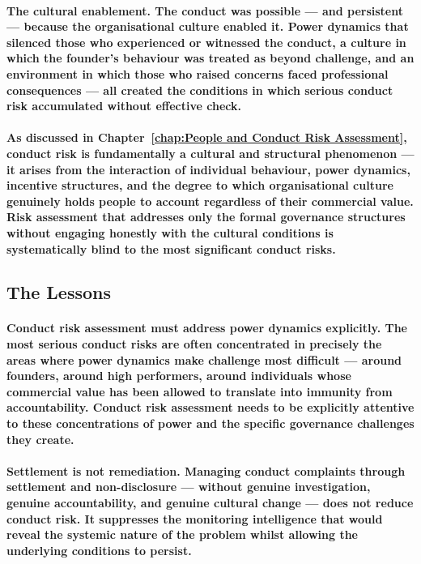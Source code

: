 \paragraph{\textbf{The cultural enablement}. The conduct was possible — and persistent — because the organisational culture enabled it. Power dynamics that silenced those who experienced or witnessed the conduct, a culture in which the founder's behaviour was treated as beyond challenge, and an environment in which those who raised concerns faced professional consequences — all created the conditions in which serious conduct risk accumulated without effective check.}
\paragraph{As discussed in Chapter~\ref{chap:People and Conduct Risk Assessment}, conduct risk is fundamentally a cultural and structural phenomenon — it arises from the interaction of individual behaviour, power dynamics, incentive structures, and the degree to which organisational culture genuinely holds people to account regardless of their commercial value. Risk assessment that addresses only the formal governance structures without engaging honestly with the cultural conditions is systematically blind to the most significant conduct risks.}

\subsection{The Lessons}
\paragraph{\textbf{Conduct risk assessment must address power dynamics explicitly}. The most serious conduct risks are often concentrated in precisely the areas where power dynamics make challenge most difficult — around founders, around high performers, around individuals whose commercial value has been allowed to translate into immunity from accountability. Conduct risk assessment needs to be explicitly attentive to these concentrations of power and the specific governance challenges they create.}
\paragraph{\textbf{Settlement is not remediation}. Managing conduct complaints through settlement and non-disclosure — without genuine investigation, genuine accountability, and genuine cultural change — does not reduce conduct risk. It suppresses the monitoring intelligence that would reveal the systemic nature of the problem whilst allowing the underlying conditions to persist.}
